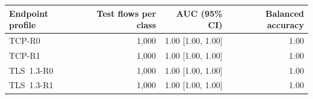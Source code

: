 \begin{tabular}{lrrr}
\toprule
\textbf{Endpoint profile} & \textbf{Test flows per class} & \textbf{AUC (95\% CI)} & \textbf{Balanced accuracy} \\
\midrule
TCP-R0 & 1,000 & 1.00 [1.00, 1.00] & 1.00 \\
TCP-R1 & 1,000 & 1.00 [1.00, 1.00] & 1.00 \\
TLS~1.3-R0 & 1,000 & 1.00 [1.00, 1.00] & 1.00 \\
TLS~1.3-R1 & 1,000 & 1.00 [1.00, 1.00] & 1.00 \\
\bottomrule
\end{tabular}
